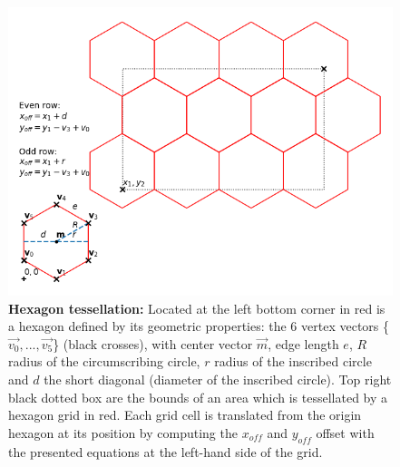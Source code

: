 		\begin{figure}[ht]
			\centering
			\includegraphics[scale=.66]{img/hexagons}
			\caption[Hexagon tessellation]{\textbf{Hexagon tessellation:} Located at the left bottom corner in red is a hexagon defined by its geometric properties: the 6 vertex vectors \{$\vec{v_0},...,\vec{v_5}$\} (black crosses), with center vector $\vec{m}$, edge length $e$, $R$ radius of the circumscribing circle, $r$ radius of the inscribed circle and $d$ the short diagonal (diameter of the inscribed circle). Top right black dotted box are the bounds of an area which is tessellated by a hexagon grid in red. Each grid cell is translated from the origin hexagon at its position by computing the $x_{off}$ and $y_{off}$ offset with the presented equations at the left-hand side of the grid. }
			\label{fig:hexagon}
		\end{figure}

